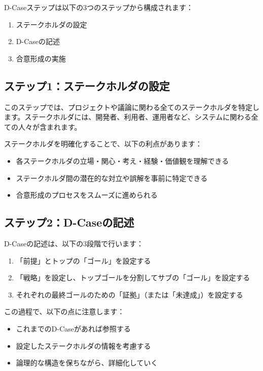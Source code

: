 D-Caseステップは以下の3つのステップから構成されます：

\begin{enumerate}
    \item ステークホルダの設定
    \item D-Caseの記述
    \item 合意形成の実施
\end{enumerate}

\subsection{ステップ1：ステークホルダの設定}

このステップでは、プロジェクトや議論に関わる全てのステークホルダを特定します。ステークホルダには、開発者、利用者、運用者など、システムに関わる全ての人々が含まれます。

ステークホルダを明確化することで、以下の利点があります：

\begin{itemize}
    \item 各ステークホルダの立場・関心・考え・経験・価値観を理解できる
    \item ステークホルダ間の潜在的な対立や誤解を事前に特定できる
    \item 合意形成のプロセスをスムーズに進められる
\end{itemize}

\subsection{ステップ2：D-Caseの記述}

D-Caseの記述は、以下の3段階で行います：

\begin{enumerate}
    \item 「前提」とトップの「ゴール」を設定する
    \item 「戦略」を設定し、トップゴールを分割してサブの「ゴール」を設定する
    \item それぞれの最終ゴールのための「証拠」（または「未達成」）を設定する
\end{enumerate}

この過程で、以下の点に注意します：

\begin{itemize}
    \item これまでのD-Caseがあれば参照する
    \item 設定したステークホルダの情報を考慮する
    \item 論理的な構造を保ちながら、詳細化していく
\end{itemize}

